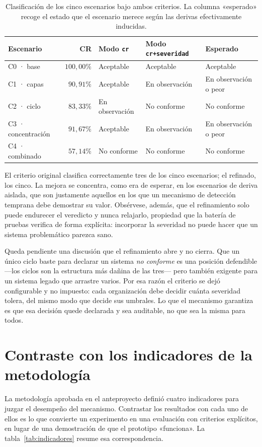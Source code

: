 \begin{table}[H]
\centering
\caption{Clasificación de los cinco escenarios bajo ambos criterios. La columna «esperado» recoge el estado que el escenario merece según las derivas efectivamente inducidas.}
\label{tab:refinamiento}
\footnotesize
\begin{tabular}{lrlll}
\toprule
\textbf{Escenario} & \textbf{CR} & \textbf{Modo \texttt{cr}} & \textbf{Modo \texttt{cr+severidad}} & \textbf{Esperado} \\
\midrule
C0 · base          & $100{,}00\%$ & Aceptable      & Aceptable      & Aceptable \\
C1 · capas         & $90{,}91\%$  & Aceptable      & En observación & En observación o peor \\
C2 · ciclo         & $83{,}33\%$  & En observación & No conforme    & No conforme \\
C3 · concentración & $91{,}67\%$  & Aceptable      & En observación & En observación o peor \\
C4 · combinado     & $57{,}14\%$  & No conforme    & No conforme    & No conforme \\
\bottomrule
\end{tabular}
\end{table}

El criterio original clasifica correctamente tres de los cinco escenarios; el refinado, los cinco. La mejora se concentra, como era de esperar, en los escenarios de deriva aislada, que son justamente aquellos en los que un mecanismo de detección temprana debe demostrar su valor. Obsérvese, además, que el refinamiento solo puede endurecer el veredicto y nunca relajarlo, propiedad que la batería de pruebas verifica de forma explícita: incorporar la severidad no puede hacer que un sistema problemático parezca sano.

Queda pendiente una discusión que el refinamiento abre y no cierra. Que un único ciclo baste para declarar un sistema \textit{no conforme} es una posición defendible ---los ciclos son la estructura más dañina de las tres--- pero también exigente para un sistema legado que arrastre varios. Por esa razón el criterio se dejó configurable y no impuesto: cada organización debe decidir cuánta severidad tolera, del mismo modo que decide sus umbrales. Lo que el mecanismo garantiza es que esa decisión quede declarada y sea auditable, no que sea la misma para todos.

\section{Contraste con los indicadores de la metodología}
La metodología aprobada en el anteproyecto definió cuatro indicadores para juzgar el desempeño del mecanismo. Contrastar los resultados con cada uno de ellos es lo que convierte un experimento en una evaluación con criterios explícitos, en lugar de una demostración de que el prototipo «funciona». La tabla~\ref{tab:indicadores} resume esa correspondencia.

